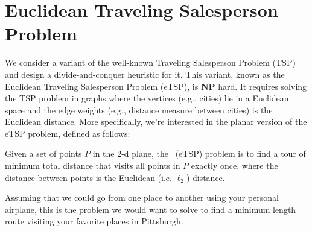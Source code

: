 \section{Euclidean Traveling Salesperson Problem}
\label{sec:design::dc::etsp}

\begin{cluster}
\label{grp:grm:design::dc::variant}

\begin{gram}
\label{grm:design::dc::variant}
We consider a variant of the  well-known Traveling Salesperson Problem (TSP) and design a divide-and-conquer heuristic for it.
This variant, known as the Euclidean Traveling Salesperson Problem
(eTSP), is $\textbf{NP}$ hard.
It requires solving the TSP problem in graphs where the vertices
(e.g., cities) lie in a Euclidean space and the edge weights (e.g.,
distance measure between cities) is the Euclidean distance.  More
specifically, we're interested in the planar version of the eTSP
problem, defined as follows:

\end{gram}
\end{cluster}

\begin{cluster}
\label{grp:def:design::dc::the-planar-euclidean-traveling-salesperson-problem}

\begin{definition}
\label{def:design::dc::the-planar-euclidean-traveling-salesperson-problem}
  Given a set of points $P$ in the $2$-d plane, the~ (eTSP) problem is to find a tour of minimum total
  distance that visits all points in $P$ exactly once, where the distance
  between points is the Euclidean (i.e. $\ell_2$) distance.

\end{definition}
\end{cluster}

\begin{cluster}
\label{grp:xmpl:design::dc::assuming}

\begin{example}
\label{xmpl:design::dc::assuming}
Assuming that we could go from one place to another using your
personal airplane, this is the problem we would want to solve to find
a minimum length route visiting your favorite places in Pittsburgh.

\end{example}
\end{cluster}

